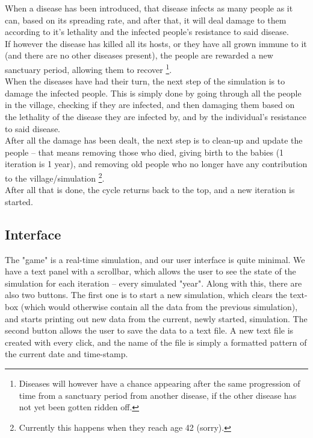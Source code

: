 \documentclass[conference,compsoc]{IEEEtran}
\begin{document}
When a disease has been introduced, that disease infects as many people as it can, based on its spreading rate, and after that, it will deal damage to them according to it's lethality and the infected people's resistance to said disease.\\
If however the disease has killed all its hosts, or they have all grown immune to it (and there are no other diseases present), the people are rewarded a new sanctuary period, allowing them to recover \footnote{Diseases will however have a chance appearing after the same progression of time from a sanctuary period from another disease, if the other disease has not yet been gotten ridden off.}.\\
When the diseases have had their turn, the next step of the simulation is to damage the infected people. This is simply done by going through all the people in the village, checking if they are infected, and then damaging them based on the lethality of the disease they are infected by, and by the individual's resistance to said disease.\\
After all the damage has been dealt, the next step is to clean-up and update the people – that means removing those who died, giving birth to the babies (1 iteration is 1 year), and removing old people who no longer have any contribution to the village/simulation \footnote{Currently this happens when they reach age 42 (sorry).}.\\
After all that is done, the cycle returns back to the top, and a new iteration is started.\\

\subsection{Interface}
The "game" is a real-time simulation, and our user interface is quite minimal. We have a text panel with a scrollbar, which allows the user to see the state of the simulation for each iteration – every simulated "year". Along with this, there are also two buttons. The first one is to start a new simulation, which clears the text-box (which would otherwise contain all the data from the previous simulation), and starts printing out new data from the current, newly started, simulation. The second button allows the user to save the data to a text file. A new text file is created with every click, and the name of the file is simply a formatted pattern of the current date and time-stamp.\\
\end{document}
